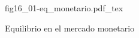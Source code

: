 \begin{figure}[h]
\centering
\def\svgwidth{0.5\textwidth}
{fig16_01-eq_monetario.pdf_tex}
\caption{Equilibrio en el mercado monetario}
\label{fig16_01-eq_monetario}
\end{figure}